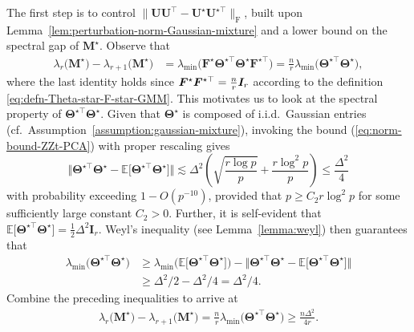 The first step  is to control $\|\bm{U}\bm{U}^{\top}-\bm{U}^{\star}\bm{U}^{\star\top}\|_{\mathrm{F}}$,
built upon Lemma~\ref{lem:perturbation-norm-Gaussian-mixture} and a lower bound on the spectral gap of $\bm{M}^{\star}$.
Observe that
%
\begin{align*}
\lambda_{r}\big(\bm{M}^{\star}\big)-\lambda_{r+1}\big(\bm{M}^{\star}\big)
& =\lambda_{\min}\big(\bm{F}^{\star}\bm{\Theta}^{\star\top}\bm{\Theta}^{\star}\bm{F}^{\star\top}\big)
 =\frac{n}{r}\lambda_{\min}\big(\bm{\Theta}^{\star\top}\bm{\Theta}^{\star}\big) ,
\end{align*}
%
where the last identity holds since  $\bm{F}^{\star} \bm{F}^{\star\top} = \frac{n}{r} {\boldsymbol I}_r$ according to the definition \eqref{eq:defn-Theta-star-F-star-GMM}.
This motivates us to look at the spectral property of $\bm{\Theta}^{\star\top}\bm{\Theta}^{\star}$.
Given that $\bm{\Theta}^{\star}$ is composed of i.i.d.~Gaussian entries (cf.~Assumption~\ref{assumption:gaussian-mixture}),
invoking the bound (\ref{eq:norm-bound-ZZt-PCA}) with proper rescaling gives
%
\[
	\big\Vert \bm{\Theta}^{\star\top}\bm{\Theta}^{\star}-\mathbb{E}\big[\bm{\Theta}^{\star\top}\bm{\Theta}^{\star}\big]\big\Vert
	\lesssim\Delta^{2}\left(\sqrt{\frac{r\log p}{p}}+\frac{r\log^{2}p}{p}\right)\leq\frac{\Delta^{2}}{4}
\]
%
with probability exceeding $1-O(p^{-10})$, provided that $p\geq C_{2}r\log^{2}p$ for some sufficiently large constant $C_{2}>0$.
Further, it is self-evident that $\mathbb{E}\big[\bm{\Theta}^{\star\top}\bm{\Theta}^{\star}\big] = \frac{1}{2}\Delta^{2} \bm{I}_{r}$.
Weyl's inequality (see Lemma~\ref{lemma:weyl}) then guarantees that
%
\begin{align*}
\lambda_{\min}\big(\bm{\Theta}^{\star\top}\bm{\Theta}^{\star}\big)
& \geq\lambda_{\min}\big(\mathbb{E}\big[\bm{\Theta}^{\star\top}\bm{\Theta}^{\star}\big]\big)
  -\big\Vert \bm{\Theta}^{\star\top}\bm{\Theta}^{\star}-\mathbb{E}\big[\bm{\Theta}^{\star\top}\bm{\Theta}^{\star}\big] \big\Vert \\
 & \geq {\Delta^{2}}/{2} - {\Delta^{2}}/{4} = {\Delta^{2}}/{4}.
\end{align*}
%
Combine the preceding inequalities to arrive at
%
\begin{align}
\lambda_{r}\big(\bm{M}^{\star}\big)-\lambda_{r+1}\big(\bm{M}^{\star}\big)
= \frac{n}{r}\lambda_{\min}\big(\bm{\Theta}^{\star\top}\bm{\Theta}^{\star}\big)
 \geq   \frac{n\Delta^2}{ 4 r} .
\label{eq:eigen-gap-GMM-12345}
\end{align}
%


